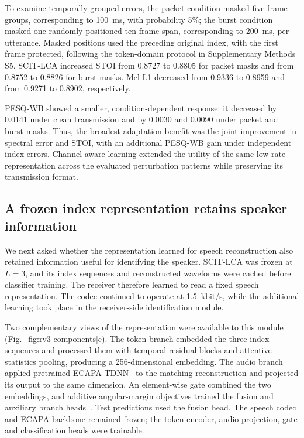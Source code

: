 

To examine temporally grouped errors, the packet condition masked five-frame groups, corresponding to 100~ms, with probability 5\%; the burst condition masked one randomly positioned ten-frame span, corresponding to 200~ms, per utterance. Masked positions used the preceding original index, with the first frame protected, following the token-domain protocol in Supplementary Methods S5. SCIT-LCA increased STOI from 0.8727 to 0.8805 for packet masks and from 0.8752 to 0.8826 for burst masks. Mel-L1 decreased from 0.9336 to 0.8959 and from 0.9271 to 0.8902, respectively.

PESQ-WB showed a smaller, condition-dependent response: it decreased by 0.0141 under clean transmission and by 0.0030 and 0.0090 under packet and burst masks. Thus, the broadest adaptation benefit was the joint improvement in spectral error and STOI, with an additional PESQ-WB gain under independent index errors. Channel-aware learning extended the utility of the same low-rate representation across the evaluated perturbation patterns while preserving its transmission format.

\subsection{A frozen index representation retains speaker information}
\label{sec:rv3-speaker}
We next asked whether the representation learned for speech reconstruction also retained information useful for identifying the speaker. SCIT-LCA was frozen at $L=3$, and its index sequences and reconstructed waveforms were cached before classifier training. The receiver therefore learned to read a fixed speech representation. The codec continued to operate at 1.5~kbit/s, while the additional learning took place in the receiver-side identification module.

Two complementary views of the representation were available to this module (Fig.~\ref{fig:rv3-components}c). The token branch embedded the three index sequences and processed them with temporal residual blocks and attentive statistics pooling, producing a 256-dimensional embedding. The audio branch applied pretrained ECAPA-TDNN~\cite{ecapa} to the matching reconstruction and projected its output to the same dimension. An element-wise gate combined the two embeddings, and additive angular-margin objectives trained the fusion and auxiliary branch heads~\cite{arcface}. Test predictions used the fusion head. The speech codec and ECAPA backbone remained frozen; the token encoder, audio projection, gate and classification heads were trainable.

